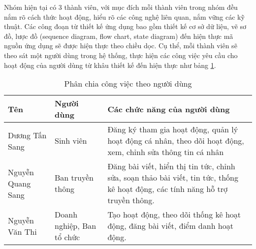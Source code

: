 Nhóm hiện tại có 3 thành viên, với mục đích mỗi thành viên trong nhóm đều nắm rõ cách thức hoạt động, hiểu rõ các công nghệ liên quan, nắm vững các kỹ thuật. Các công đoạn từ thiết kế ứng dụng bao gồm thiết kế cơ sở dữ liệu, vẽ sơ đồ, lược đồ (sequence diagram, flow chart, state diagram) đến hiện thực mã nguồn ứng dụng sẽ được hiện thực theo chiều dọc. Cụ thể, mỗi thành viên sẽ theo sát một người dùng trong hệ thống, thực hiện các công việc yêu cầu cho hoạt động của người dùng từ khâu thiết kế đến hiện thực như bảng \ref{tab:separate}.

\begin{table}[h]
    \centering
    \begin{tabularx}{\textwidth}{|l|l|X|}
    \hline
        Tên & Người dùng  & Các chức năng của người dùng\\
    \hline
        Dương Tấn Sang & Sinh viên & Đăng ký tham gia hoạt động, quản lý hoạt động cá nhân, theo dõi hoạt động, xem, chỉnh sửa thông tin cá nhân\\
    \hline
         Nguyễn Quang Sang & Ban truyền thông & Đăng bài viết, hiển thị tin tức, chỉnh sửa, soạn thảo bài viết, tin tức, thống kê hoạt động, các tính năng hỗ trợ truyền thông.\\
    \hline         
    Nguyễn Văn Thi & Doanh nghiệp, Ban tổ chức & Tạo hoạt động, theo dõi thống kê hoạt động, đăng bài viết, điểm danh hoạt động.\\
    \hline         
    \end{tabularx}
    \caption{Phân chia công việc theo người dùng}
    \label{tab:separate}
\end{table}
